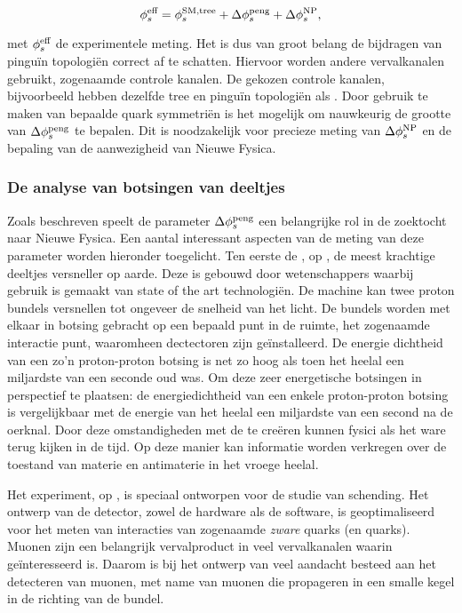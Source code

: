 \begin{equation}
\centering
 \phis^{\text {eff}} = \phis^{\tiny \text{SM,tree}} + \Delta\phiS{peng} + \Delta\phis^{\tiny \text{NP}},
 \label{app_nl_phis_sm_peng}
\end{equation}


\noindent met $\phi_{s}^{\text {eff}}$ de experimentele \phis meting. Het is dus van groot belang de
bijdragen van pingu\"in topologi\"en correct af te schatten. Hiervoor worden andere \Bs vervalkanalen gebruikt,
 zogenaamde controle kanalen. De gekozen controle kanalen, bijvoorbeeld \BsJpsiKst hebben dezelfde tree en
  pingu\"in topologi\"en als \BsJpsiPhi. Door gebruik te maken van bepaalde quark symmetri\"en is het
  mogelijk om nauwkeurig de grootte van $\Delta\phi_{s}^{\tiny\text{peng}}$ te bepalen. Dit is noodzakelijk voor precieze
  meting van $\Delta\phi_{s}^{\tiny \text{NP}}$ en de bepaling van de aanwezigheid van Nieuwe Fysica.





\subsubsection{De analyse van botsingen van deeltjes}
Zoals beschreven speelt de parameter $\Delta\phi_{s}^{\tiny\text{peng}}$ een belangrijke rol in de zoektocht naar Nieuwe Fysica. Een aantal interessant aspecten van de meting van deze parameter worden hieronder toegelicht. Ten eerste de \lhc, op \cern, de meest krachtige deeltjes versneller op aarde. Deze is gebouwd door wetenschappers waarbij gebruik is gemaakt van state of the art technologi\"en. De machine kan twee proton bundels versnellen tot ongeveer de snelheid van het licht. De bundels worden met elkaar in botsing gebracht op een bepaald punt in de ruimte, het zogenaamde interactie punt, waaromheen dectectoren zijn ge\"installeerd. De energie dichtheid van een zo'n proton-proton botsing is net zo hoog als toen het heelal een miljardste van een seconde oud was. Om deze zeer energetische botsingen in perspectief te plaatsen: de energiedichtheid van een enkele proton-proton botsing is vergelijkbaar met de energie van het heelal een miljardste van een second na de oerknal. Door deze omstandigheden met de \lhc te cre\"eren kunnen fysici als het ware terug kijken  in de tijd. Op deze manier kan informatie worden verkregen over de toestand van materie en antimaterie in het vroege heelal.

Het \lhcb experiment, op \cern, is speciaal ontworpen voor de studie van \CP schending. Het ontwerp van de detector, zowel de hardware als de software, is geoptimaliseerd voor het meten van interacties van zogenaamde {\it zware} quarks (\bquark en \cquark quarks). Muonen zijn een belangrijk vervalproduct in veel vervalkanalen waarin \lhcb ge\"interesseerd is.  Daarom is bij het ontwerp van \lhcb veel aandacht besteed aan het detecteren van muonen, met name van muonen die propageren in een smalle kegel in de richting van de bundel.


